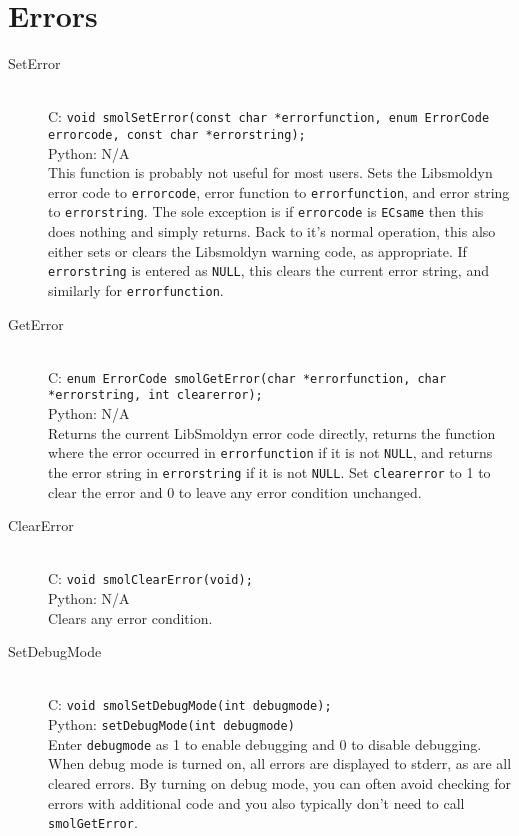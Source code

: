 \documentclass {book}
\begin{document}
\section{Errors}

\begin{description}

\item[SetError]
\hfill \\
C: \texttt{void smolSetError(const char *errorfunction, enum ErrorCode errorcode, const char *errorstring);}\\
Python: N/A\\
This function is probably not useful for most users. Sets the Libsmoldyn error code to \texttt{errorcode}, error function to \texttt{errorfunction}, and error string to \texttt{errorstring}. The sole exception is if \texttt{errorcode} is \texttt{ECsame} then this does nothing and simply returns. Back to it's normal operation, this also either sets or clears the Libsmoldyn warning code, as appropriate. If \texttt{errorstring} is entered as \texttt{NULL}, this clears the current error string, and similarly for \texttt{errorfunction}.

\item[GetError]
\hfill \\
C: \texttt{enum ErrorCode smolGetError(char *errorfunction, char *errorstring, int clearerror);}\\
Python: N/A\\
Returns the current LibSmoldyn error code directly, returns the function where the error occurred in \texttt{errorfunction} if it is not \texttt{NULL}, and returns the error string in \texttt{errorstring} if it is not \texttt{NULL}. Set \texttt{clearerror} to 1 to clear the error and 0 to leave any error condition unchanged.

\item[ClearError]
\hfill \\
C: \texttt{void smolClearError(void);}\\
Python: N/A\\
Clears any error condition.

\item[SetDebugMode]
\hfill \\
C: \texttt{void smolSetDebugMode(int debugmode);}\\
Python: \texttt{setDebugMode(int debugmode)}\\
Enter \texttt{debugmode} as 1 to enable debugging and 0 to disable debugging. When debug mode is turned on, all errors are displayed to stderr, as are all cleared errors. By turning on debug mode, you can often avoid checking for errors with additional code and you also typically don't need to call \texttt{smolGetError}.


\end{description}
\end{document}
